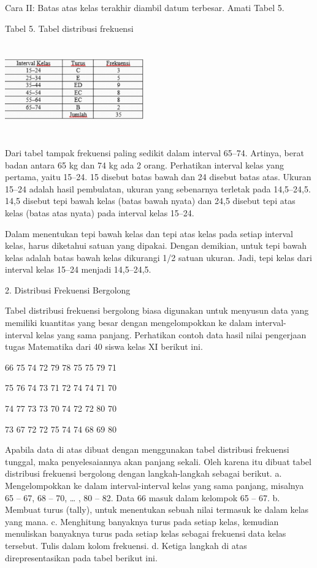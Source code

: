 \documentclass[11pt,fleqn]{book} %
\begin{document}
{Cara II: Batas atas kelas terakhir diambil datum terbesar. Amati Tabel 5.


Tabel 5. Tabel distribusi frekuensi

\includegraphics[width = 6cm, height= 4cm]{Pictures/18reska.png}

Dari tabel tampak frekuensi paling sedikit dalam interval 65–74. Artinya, berat badan antara 65 kg dan 74 kg ada 2 orang. Perhatikan interval kelas yang pertama, yaitu 15–24. 15 disebut batas bawah dan 24 disebut batas atas. Ukuran 15–24 adalah hasil pembulatan, ukuran yang sebenarnya terletak pada 14,5–24,5. 14,5 disebut tepi bawah kelas (batas bawah nyata) dan 24,5 disebut tepi atas kelas (batas atas nyata) pada interval kelas 15–24.

Dalam menentukan tepi bawah kelas dan tepi atas kelas pada setiap interval kelas, harus diketahui satuan yang dipakai. Dengan demikian, untuk tepi bawah kelas adalah batas bawah kelas dikurangi 1/2 satuan ukuran. Jadi, tepi kelas dari interval kelas 15–24 menjadi 14,5–24,5.


2. Distribusi Frekuensi Bergolong

Tabel distribusi frekuensi bergolong biasa digunakan untuk menyusun data yang
memiliki kuantitas yang besar dengan mengelompokkan ke dalam interval-interval kelas
yang sama panjang. Perhatikan contoh data hasil nilai pengerjaan tugas Matematika
dari 40 siswa kelas XI berikut ini.


66 75 74 72 79 78 75 75 79 71

75 76 74 73 71 72 74 74 71 70

74 77 73 73 70 74 72 72 80 70

73 67 72 72 75 74 74 68 69 80



Apabila data di atas dibuat dengan menggunakan tabel distribusi frekuensi tunggal,
maka penyelesaiannya akan panjang sekali. Oleh karena itu dibuat tabel distribusi
frekuensi bergolong dengan langkah-langkah sebagai berikut.
a. Mengelompokkan ke dalam interval-interval kelas yang sama panjang, misalnya
65 – 67, 68 – 70, … , 80 – 82. Data 66 masuk dalam kelompok 65 – 67.
b. Membuat turus (tally), untuk menentukan sebuah nilai termasuk ke dalam kelas
yang mana.
c. Menghitung banyaknya turus pada setiap kelas, kemudian menuliskan banyaknya
turus pada setiap kelas sebagai frekuensi data kelas tersebut. Tulis dalam kolom
frekuensi.
d. Ketiga langkah di atas direpresentasikan pada tabel berikut ini.


}
\end{document}
